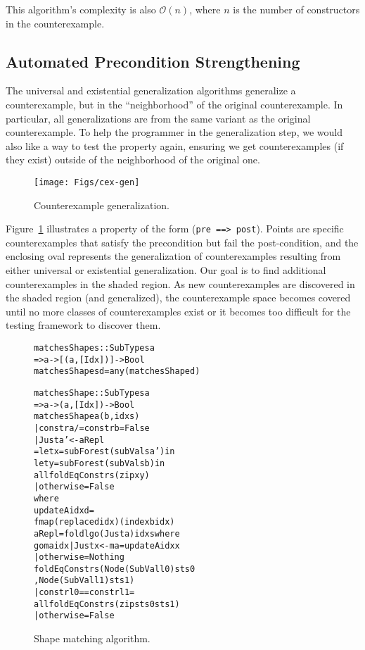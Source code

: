 \documentclass{sigplanconf}
\newenvironment{code}{\begin{alltt}\footnotesize}{\end{alltt}}
\newcommand{\ttp}[1]{\texttt{#1}}
\begin{document}
This algorithm's complexity is also $\mathcal{O}(n)$, where $n$ is the number of
constructors in the counterexample.

\subsection{Automated Precondition Strengthening}\label{sec:precondition}
The universal and existential generalization algorithms generalize a
counterexample, but in the ``neighborhood'' of the original counterexample.  In
particular, all generalizations are from the same variant as the original
counterexample.  To help the programmer in the generalization step, we would
also like a way to test the property again, ensuring we get counterexamples (if
they exist) outside of the neighborhood of the original one.

\begin{figure}[ht!]
  \begin{center}
    \texttt{[image: Figs/cex-gen]}
   \end{center}
  \caption{Counterexample generalization.}
  \label{fig:cex-gen}
\end{figure}

Figure~\ref{fig:cex-gen} illustrates a property of the form (\ttp{pre ==>
  post}).  Points are specific counterexamples that satisfy the precondition but
fail the post-condition, and the enclosing oval represents the generalization of
counterexamples resulting from either universal or existential generalization.
Our goal is to find additional counterexamples in the shaded region.  As new
counterexamples are discovered in the shaded region (and generalized), the
counterexample space becomes covered until no more classes of counterexamples
exist or it becomes too difficult for the testing framework to discover them.

\begin{figure}
  \begin{code}
matchesShapes :: SubTypes a
  => a -> [(a,[Idx])] -> Bool
matchesShapes d = any (matchesShape d)

matchesShape :: SubTypes a
  => a -> (a, [Idx]) -> Bool
matchesShape a (b, idxs)
  | constr a /= constr b = False
  | Just a' <- aRepl
  = let x = subForest (subVals a') in
    let y = subForest (subVals b)  in
    all foldEqConstrs (zip x y)
  | otherwise = False
  where
  updateA idx d =
    fmap (replace d idx) (index b idx)
  aRepl = foldl go (Just a) idxs where
    go ma idx | Just x <- ma = updateA idx x
              | otherwise    = Nothing
  foldEqConstrs ( Node (SubVal l0) sts0
                , Node (SubVal l1) sts1 )
    | constr l0 == constr l1 =
      all foldEqConstrs (zip sts0 sts1)
    | otherwise              = False
  \end{code}
  \caption{Shape matching algorithm.}
  \label{fig:matches}
\end{figure}
\end{document}
